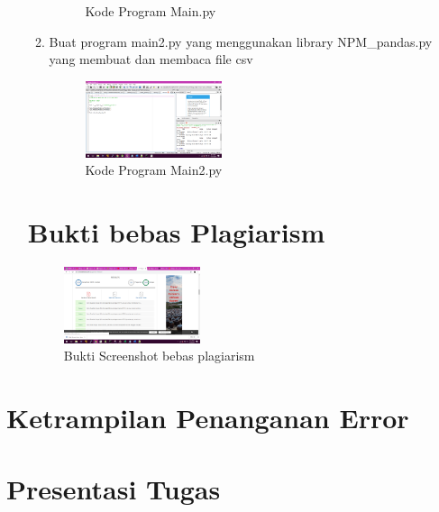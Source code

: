 \begin{enumerate}
\begin{enumerate}
\begin{figure}[H]
			\caption{Kode Program Main.py}
	\end{figure}
\item Buat program main2.py yang menggunakan library NPM\_pandas.py yang membuat dan membaca file csv

\begin{figure}[H]
			\includegraphics[width=4cm]{figures/1184065/kp2.png}
			\centering
			\caption{Kode Program Main2.py}
	\end{figure}
\end{enumerate}
\section{Bukti bebas Plagiarism}
\begin{figure}[H]
			\includegraphics[width=4cm]{figures/1184065/ss2.png}
			\centering
			\caption{Bukti Screenshot bebas plagiarism}
	\end{figure}
\end{enumerate}
\section{Ketrampilan Penanganan Error}

\section{Presentasi Tugas}






